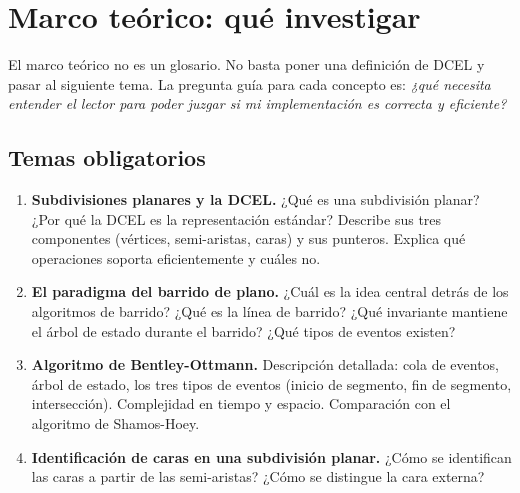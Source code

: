 \documentclass[12pt, oneside]{article}
\begin{document}
\section{Marco teórico: qué investigar}
\label{sec:teoria}

El marco teórico no es un glosario.  No basta poner una definición de
DCEL y pasar al siguiente tema.  La pregunta guía para cada concepto
es: \textit{¿qué necesita entender el lector para poder juzgar si mi
implementación es correcta y eficiente?}

\subsection{Temas obligatorios}

\begin{enumerate}

  \item \textbf{Subdivisiones planares y la DCEL.}
        ¿Qué es una subdivisión planar?  ¿Por qué la DCEL es la
        representación estándar?  Describe sus tres componentes
        (vértices, semi-aristas, caras) y sus punteros.  Explica qué
        operaciones soporta eficientemente y cuáles no.

  \item \textbf{El paradigma del barrido de plano.}
        ¿Cuál es la idea central detrás de los algoritmos de barrido?
        ¿Qué es la línea de barrido?  ¿Qué invariante mantiene el
        árbol de estado durante el barrido?  ¿Qué tipos de eventos
        existen?

  \item \textbf{Algoritmo de Bentley-Ottmann.}
        Descripción detallada: cola de eventos, árbol de estado, los
        tres tipos de eventos (inicio de segmento, fin de segmento,
        intersección).  Complejidad en tiempo y espacio.  Comparación
        con el algoritmo de Shamos-Hoey.

  \item \textbf{Identificación de caras en una subdivisión planar.}
        ¿Cómo se identifican las caras a partir de las semi-aristas?
        ¿Cómo se distingue la cara externa?

\end{enumerate}
\end{document}
